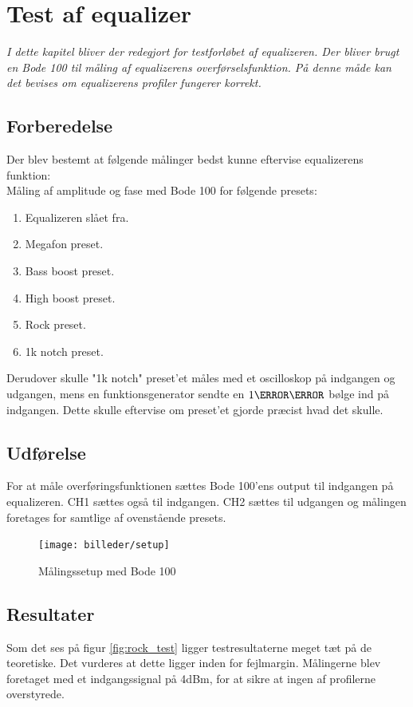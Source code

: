 \chapter{Test af equalizer}\label{sec:test_eq}

\emph{I dette kapitel bliver der redegjort for testforløbet af equalizeren. Der bliver brugt en Bode 100 til måling af equalizerens overførselsfunktion. På denne måde kan det bevises om equalizerens profiler fungerer korrekt.}

\section{Forberedelse}

Der blev bestemt at følgende målinger bedst kunne eftervise equalizerens funktion: \\

Måling af amplitude og fase med Bode 100 for følgende presets:
\begin{enumerate}
    \item Equalizeren slået fra.
    \item Megafon preset.
    \item Bass boost preset.
    \item High boost preset.
    \item Rock preset. 
    \item 1k notch preset. \\
\end{enumerate}

Derudover skulle "1k notch" preset'et måles med et oscilloskop på indgangen og udgangen, mens en funktionsgenerator sendte en $1\kilo\hertz$ bølge ind på indgangen. Dette skulle eftervise om preset'et gjorde præcist hvad det skulle. \\

\section{Udførelse}
For at måle overføringsfunktionen sættes Bode 100'ens output til indgangen på equalizeren. CH1 sættes også til indgangen. CH2 sættes til udgangen og målingen foretages for samtlige af ovenstående presets. 

\begin{figure}[h!]
	\centering
	\texttt{[image: billeder/setup]}
	\caption{Målingssetup med Bode 100}
\end{figure}	


\section{Resultater}
Som det ses på figur \ref{fig:rock_test} ligger testresultaterne meget tæt på de teoretiske. Det vurderes at dette ligger inden for fejlmargin. Målingerne blev foretaget med et indgangssignal på 4dBm, for at sikre at ingen af profilerne overstyrede.

